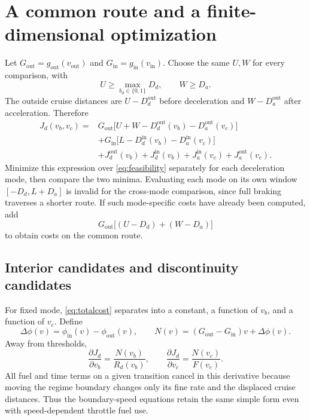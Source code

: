 \documentclass[10pt,a4paper]{article}
\newcommand{\out}{\mathrm{out}}
\newcommand{\inn}{\mathrm{in}}
\begin{document}
\section{A common route and a finite-dimensional optimization}
\label{sec:optimization}
Let $G_{\out}=g_{\out}(v_{\out})$ and $G_{\inn}=g_{\inn}(v_{\inn})$. Choose the same $U,W$ for every comparison, with
\begin{equation}
U\ge\max_{b_d\in\{0,1\}}D_d,\qquad W\ge D_a.
\end{equation}
The outside cruise distances are $U-D_d^{\out}$ before deceleration and $W-D_a^{\out}$ after acceleration. Therefore
\begin{equation}
\boxed{\begin{aligned}
J_d(v_b,v_c)={}&G_{\out}\bigl[U+W-D_d^{\out}(v_b)-D_a^{\out}(v_c)\bigr]\\
&+G_{\inn}\bigl[L-D_d^{\inn}(v_b)-D_a^{\inn}(v_c)\bigr]\\
&+J_d^{\out}(v_b)+J_d^{\inn}(v_b)
 +J_a^{\inn}(v_c)+J_a^{\out}(v_c).
\end{aligned}}
\label{eq:totalcost}
\end{equation}
Minimize this expression over \eqref{eq:feasibility} separately for each deceleration mode, then compare the two minima. Evaluating each mode on its own window $[-D_d,L+D_a]$ is invalid for the cross-mode comparison, since full braking traverses a shorter route. If such mode-specific costs have already been computed, add
\begin{equation}
G_{\out}\bigl[(U-D_d)+(W-D_a)\bigr]
\end{equation}
to obtain costs on the common route.

\subsection{Interior candidates and discontinuity candidates}
For fixed mode, \eqref{eq:totalcost} separates into a constant, a function of $v_b$, and a function of $v_c$. Define
\begin{equation}
\Delta\phi(v)=\phi_{\inn}(v)-\phi_{\out}(v),\qquad
N(v)=(G_{\out}-G_{\inn})v+\Delta\phi(v).
\end{equation}
Away from thresholds,
\begin{equation}
\frac{\partial J_d}{\partial v_b}=\frac{N(v_b)}{R_d(v_b)},\qquad
\frac{\partial J_d}{\partial v_c}=\frac{N(v_c)}{F(v_c)}.
\label{eq:partials}
\end{equation}
All fuel and time terms on a given transition cancel in this derivative because moving the regime boundary changes only its fine rate and the displaced cruise distances. Thus the boundary-speed equations retain the same simple form even with speed-dependent throttle fuel use.
\end{document}
